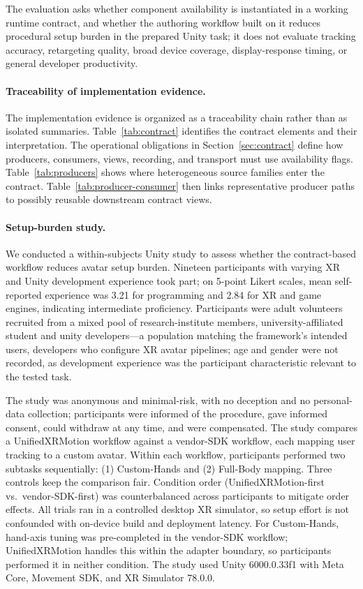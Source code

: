 \documentclass[runningheads]{llncs}
\begin{document}
The evaluation asks whether component availability is instantiated in a working runtime contract, and whether the authoring workflow built on it reduces procedural setup burden in the prepared Unity task; it does not evaluate tracking accuracy, retargeting quality, broad device coverage, display-response timing, or general developer productivity.

\paragraph{Traceability of implementation evidence.}
	The implementation evidence is organized as a traceability chain rather than as isolated summaries.
	Table~\ref{tab:contract}  identifies the contract elements and their interpretation.
	The operational obligations in Section~\ref{sec:contract} define how producers, consumers, views, recording, and transport must use availability flags.
	Table~\ref{tab:producers} shows where heterogeneous source families enter the contract.
	Table~\ref{tab:producer-consumer} then links representative producer paths to possibly reusable downstream contract views.

\paragraph{Setup-burden study.}

	We conducted a within-subjects Unity study to assess whether the contract-based workflow reduces avatar setup burden.
	Nineteen participants with varying XR and Unity development experience took part; on 5-point Likert scales, mean self-reported experience was 3.21 for programming and 2.84 for XR and game engines, indicating intermediate proficiency.
	Participants were adult volunteers recruited from a mixed pool of research-institute members, university-affiliated student and unity developers---a population matching the framework's intended users, developers who configure XR avatar pipelines; age and gender were not recorded, as development experience was the participant characteristic relevant to the tested task.
	
	The study was anonymous and minimal-risk, with no deception and no personal-data collection; participants were informed of the procedure, gave informed consent, could withdraw at any time, and were compensated.
	The study compares a UnifiedXRMotion workflow against a vendor-SDK workflow, each mapping user tracking to a custom avatar.
	Within each workflow, participants performed two subtasks sequentially: (1) Custom-Hands and (2) Full-Body mapping.
	Three controls keep the comparison fair.
	Condition order (UnifiedXRMotion-first vs.\ vendor-SDK-first) was counterbalanced across participants to mitigate order effects.
	All trials ran in a controlled desktop XR simulator, so setup effort is not confounded with on-device build and deployment latency.
	For Custom-Hands, hand-axis tuning was pre-completed in the vendor-SDK workflow; UnifiedXRMotion handles this within the adapter boundary, so participants performed it in neither condition.
	The study used Unity 6000.0.33f1 with Meta Core, Movement SDK, and XR Simulator 78.0.0.
\end{document}
